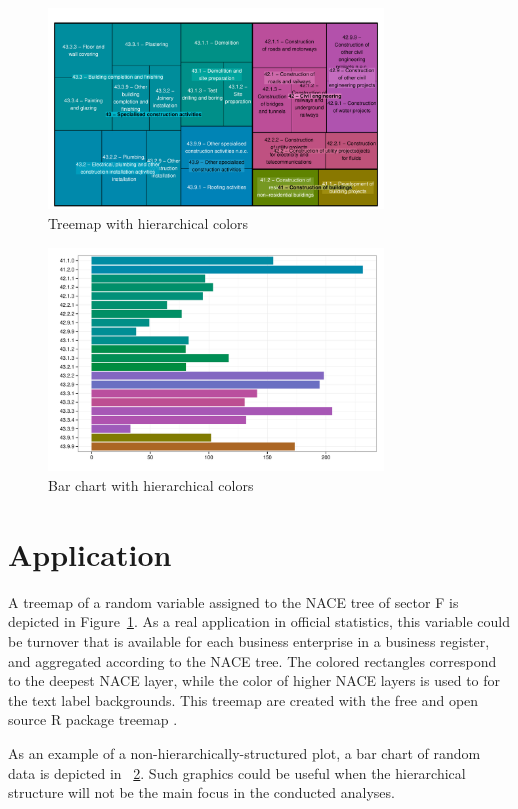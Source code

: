\documentclass[review]{vgtc}                 %
\begin{document}
\begin{figure}[htb]
  \centering
  \includegraphics[width=3.5in]{treemap_F.pdf}
  \caption{Treemap with hierarchical colors}\label{fig:treemapF}
\end{figure}



\begin{figure}[htb]
  \centering
  \includegraphics[width=3.5in]{bar_chart.pdf}
  \caption{Bar chart with hierarchical colors}\label{fig:barchart}
\end{figure}



\section{Application}

A treemap of a random variable assigned to the NACE tree of sector F is depicted in Figure~\ref{fig:treemapF}. As a real application in official statistics, this variable could be turnover that is available for each business enterprise in a business register, and aggregated according to the NACE tree. The colored rectangles correspond to the deepest NACE layer, while the color of higher NACE layers is used to for the text label backgrounds. This treemap are created with the free and open source R package treemap \cite{treemap}.

As an example of a non-hierarchically-structured plot, a bar chart of random data is depicted in ~\ref{fig:barchart}. Such graphics could be useful when the hierarchical structure will not be the main focus in the conducted analyses.
\end{document}
